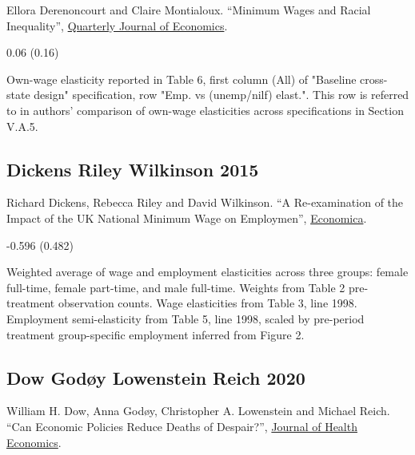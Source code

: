 \noindent Ellora Derenoncourt and Claire Montialoux. ``Minimum Wages and Racial Inequality'', \href{https://doi.org/10.1093/qje/qjaa031}{Quarterly Journal of Economics}.

\vspace{0.7em}

 0.06 (0.16)

\vspace{0.7em}

 Own-wage elasticity reported in Table 6, first column (All) of "Baseline cross-state design" specification, row "Emp. vs (unemp/nilf) elast.". This row is referred to in authors' comparison of own-wage elasticities across specifications in Section V.A.5.

\subsection*{Dickens Riley Wilkinson 2015}
\vspace{-0.7em}

\noindent Richard Dickens, Rebecca Riley and David Wilkinson. ``A Re-examination of the Impact of the UK National Minimum Wage on Employmen'', \href{https://doi.org/10.1111/ecca.12158}{Economica}.

\vspace{0.7em}

 -0.596 (0.482)

\vspace{0.7em}

 Weighted average of wage and employment elasticities across three groups: female full-time, female part-time, and male full-time. Weights from Table 2 pre-treatment observation counts. Wage elasticities from Table 3, line 1998. Employment semi-elasticity from Table 5, line 1998, scaled by pre-period treatment group-specific employment inferred from Figure 2.

\subsection*{Dow Godøy Lowenstein Reich 2020}
\vspace{-0.7em}

\noindent William H. Dow, Anna Godøy, Christopher A. Lowenstein and Michael Reich. ``Can Economic Policies Reduce Deaths of Despair?'', \href{https://doi.org/10.1016/j.jhealeco.2020.102372}{Journal of Health Economics}.

